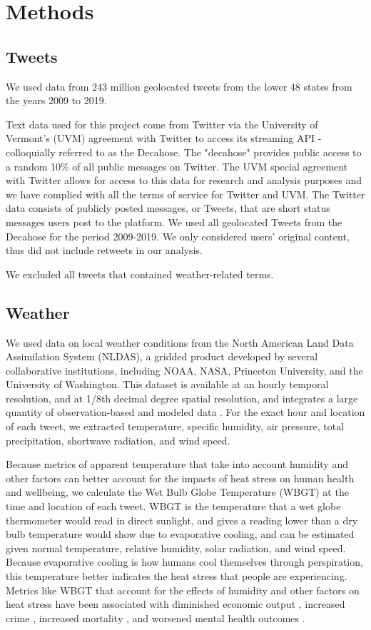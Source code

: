 \documentclass{article}
\begin{document}
\section{Methods}
\subsection{Tweets}
We used data from 243 million geolocated tweets from the lower 48 states from the years 2009 to 2019.  

Text data used for this project come from Twitter via the University of Vermont’s (UVM) agreement with Twitter to access its streaming API - colloquially referred to as the Decahose. The "decahose" provides public access to a random 10\% of all public messages on Twitter. The UVM special agreement with Twitter allows for access to this data for research and analysis purposes and we have complied with all the terms of service for Twitter and UVM. 
The Twitter data consists of publicly posted messages, or Tweets, that are short status messages users post to the platform. We used all geolocated Tweets from the Decahose for the period 2009-2019. We only considered users’ original content, thus did not include retweets in our analysis.

We excluded all tweets that contained weather-related terms.

\subsection{Weather}
We used data on local weather conditions from the North American Land Data Assimilation System (NLDAS), a gridded product developed by several collaborative institutions, including NOAA, NASA, Princeton University, and the University of Washington.  This dataset is available at an hourly temporal resolution, and at 1/8th decimal degree spatial resolution, and integrates a large quantity of observation-based and modeled data  \cite{xia_continental-scale_2012}.  For the exact hour and location of each tweet, we extracted temperature, specific humidity, air pressure, total precipitation, shortwave radiation, and wind speed.  

Because metrics of apparent temperature that take into account humidity and other factors can better account for the impacts of heat stress on human health and wellbeing, we calculate the Wet Bulb Globe Temperature (WBGT) at the time and location of each tweet.  WBGT is the temperature that a wet globe thermometer would read in direct sunlight, and gives a reading lower than a dry bulb temperature would show due to evaporative cooling, and can be estimated given normal temperature, relative humidity, solar radiation, and wind speed.  Because evaporative cooling is how humans cool themselves through perspiration, this temperature better indicates the heat stress that people are experiencing.  Metrics like WBGT that account for the effects of humidity and other factors on heat stress have been associated with diminished economic output \cite{rao2020projections}, increased crime \cite{hu2017impact}, increased mortality \cite{chien2016spatiotemporal, armstrong2019role}, and worsened mental health outcomes \cite{vida2012relationship, ding2016importance}.
\end{document}
